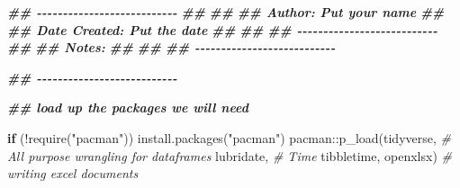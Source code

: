 \documentclass[
]{book}
\newenvironment{Shaded}{\begin{snugshade}}{\end{snugshade}}
\newcommand{\CommentTok}[1]{\textcolor[rgb]{0.56,0.35,0.01}{\textit{#1}}}
\newcommand{\ControlFlowTok}[1]{\textcolor[rgb]{0.13,0.29,0.53}{\textbf{#1}}}
\newcommand{\DocumentationTok}[1]{\textcolor[rgb]{0.56,0.35,0.01}{\textbf{\textit{#1}}}}
\newcommand{\FunctionTok}[1]{\textcolor[rgb]{0.00,0.00,0.00}{#1}}
\newcommand{\NormalTok}[1]{#1}
\newcommand{\SpecialCharTok}[1]{\textcolor[rgb]{0.00,0.00,0.00}{#1}}
\newcommand{\StringTok}[1]{\textcolor[rgb]{0.31,0.60,0.02}{#1}}
\begin{document}
\begin{Shaded}
\begin{Highlighting}[]

\DocumentationTok{\#\# {-}{-}{-}{-}{-}{-}{-}{-}{-}{-}{-}{-}{-}{-}{-}{-}{-}{-}{-}{-}{-}{-}{-}{-}{-}{-}{-}}
\DocumentationTok{\#\#}
\DocumentationTok{\#\#}
\DocumentationTok{\#\# Author: Put your name}
\DocumentationTok{\#\#}
\DocumentationTok{\#\# Date Created: Put the date}
\DocumentationTok{\#\#}
\DocumentationTok{\#\#}
\DocumentationTok{\#\# {-}{-}{-}{-}{-}{-}{-}{-}{-}{-}{-}{-}{-}{-}{-}{-}{-}{-}{-}{-}{-}{-}{-}{-}{-}{-}{-}}
\DocumentationTok{\#\#}
\DocumentationTok{\#\# Notes:}
\DocumentationTok{\#\#   }
\DocumentationTok{\#\#}
\DocumentationTok{\#\# {-}{-}{-}{-}{-}{-}{-}{-}{-}{-}{-}{-}{-}{-}{-}{-}{-}{-}{-}{-}{-}{-}{-}{-}{-}{-}{-}}

\DocumentationTok{\#\# {-}{-}{-}{-}{-}{-}{-}{-}{-}{-}{-}{-}{-}{-}{-}{-}{-}{-}{-}{-}{-}{-}{-}{-}{-}{-}{-}}

\DocumentationTok{\#\# load up the packages we will need}

\ControlFlowTok{if}\NormalTok{ (}\SpecialCharTok{!}\FunctionTok{require}\NormalTok{(}\StringTok{"pacman"}\NormalTok{)) }\FunctionTok{install.packages}\NormalTok{(}\StringTok{"pacman"}\NormalTok{)}
\NormalTok{pacman}\SpecialCharTok{::}\FunctionTok{p\_load}\NormalTok{(tidyverse, }\CommentTok{\# All purpose wrangling for dataframes}
\NormalTok{               lubridate, }\CommentTok{\# Time}
\NormalTok{               tibbletime,}
\NormalTok{               openxlsx) }\CommentTok{\# writing excel documents}


\end{Highlighting}
\end{Shaded}
\end{document}
